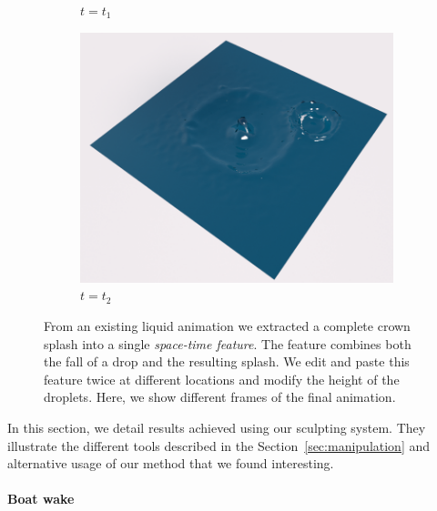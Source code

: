 \begin{figure}[th!]
\begin{subfigure}[b]{0.3\linewidth}
\caption{\label{fig:result_trajectory:t1}$t=t_{1}$}
    \end{subfigure}
    \hspace{0.1cm}
    \begin{subfigure}[b]{0.3\linewidth}
    \centering
\includegraphics[width=\textwidth]{images/fluidsculpting-mig2016/results/two_drops_2.png}
\caption{\label{fig:result_trajectory:t2}$t=t_{2}$}
    \end{subfigure}
    \caption[Fluid sculpting: Droplets]{From an existing liquid animation we extracted a complete crown splash into a single \emph{space-time feature}. The feature combines both the fall of a drop and the resulting splash. We edit and paste this feature twice at different locations and modify the height of the droplets. Here, we show different frames of the final animation.
}
    \label{fig:result_trajectory}
\end{figure}

In this section, we detail results achieved using our sculpting system.
They illustrate the different tools described in the Section~\ref{sec:manipulation} and alternative usage of our method that we found interesting.

\paragraph{Boat wake}

